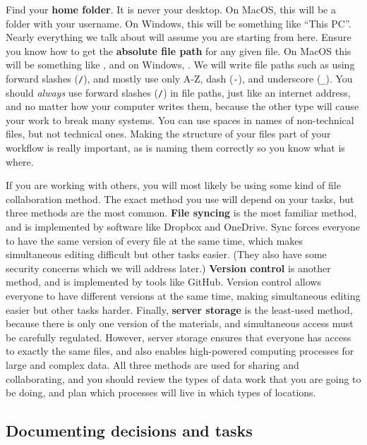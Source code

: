 Find your \textbf{home folder}. It is never your desktop.
On MacOS, this will be a folder with your username.
On Windows, this will be something like ``This PC''.
Nearly everything we talk about will assume you are starting from here.
Ensure you know how to get the \textbf{absolute file path} for any given file.
On MacOS this will be something like ,
and on Windows, .
We will write file paths such as 
using forward slashes (\texttt{/}), and mostly use only A-Z, dash (\texttt{-}), and underscore (\texttt{\_}).
You should \textit{always} use forward slashes (\texttt{/}) in file paths,
just like an internet address, and no matter how your computer writes them,
because the other type will cause your work to break many systems.
You can use spaces in names of non-technical files, but not technical ones.
Making the structure of your files part of your workflow is really important,
as is naming them correctly so you know what is where.

If you are working with others, you will most likely be using some kind
of file collaboration method.
The exact method you use will depend on your tasks,
but three methods are the most common.
\textbf{File syncing} is the most familiar method,
and is implemented by software like Dropbox and OneDrive.
Sync forces everyone to have the same version of every file at the same time,
which makes simultaneous editing difficult but other tasks easier.
(They also have some security concerns which we will address later.)
\textbf{Version control} is another method,
and is implemented by tools like GitHub.
Version control allows everyone to have different versions at the same time,
making simultaneous editing easier but other tasks harder.
Finally, \textbf{server storage} is the least-used method,
because there is only one version of the materials,
and simultaneous access must be carefully regulated.
However, server storage ensures that everyone has access
to exactly the same files, and also enables
high-powered computing processes for large and complex data.
All three methods are used for sharing and collaborating,
and you should review the types of data work
that you are going to be doing, and plan which processes
will live in which types of locations.

\subsection{Documenting decisions and tasks}

